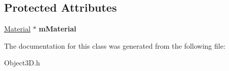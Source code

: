\subsection*{\-Protected \-Attributes}
\begin{DoxyCompactItemize}
\item 
\hypertarget{classObject3D_a9eb94e46c928f4f90b1d718119bedaf9}{\hyperlink{classMaterial}{\-Material} $\ast$ {\bfseries m\-Material}}\label{classObject3D_a9eb94e46c928f4f90b1d718119bedaf9}

\end{DoxyCompactItemize}


\-The documentation for this class was generated from the following file\-:\begin{DoxyCompactItemize}
\item 
\-Object3\-D.\-h\end{DoxyCompactItemize}
